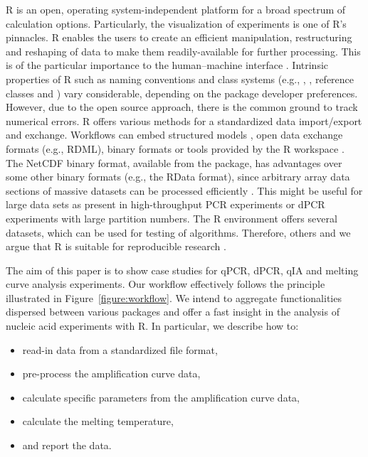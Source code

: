 R is an open, operating system-independent platform for a broad spectrum of 
calculation options. Particularly, the visualization of experiments is one of 
R's pinnacles. R enables the users to create an efficient manipulation, 
restructuring and reshaping of data to make them readily-available for further 
processing. This is of the particular importance to the human--machine interface 
\citep{Oh_2014}. Intrinsic properties of R such as naming conventions 
\citep{Baaaath_2012} and class systems (e.g., , , 
reference classes and ) vary considerable, depending on the package 
developer preferences. However, due to the open source approach, there is the 
common ground to track numerical errors. R offers various methods for a 
standardized data import/export and exchange. Workflows can embed structured 
models \citet{Guazzelli_2009}, open data exchange formats (e.g., RDML), binary 
formats \citep{michna_2013} or tools provided by the R workspace 
\citep{RDCT2010c}. The NetCDF binary format, available from the 
 package, has advantages over some other binary formats (e.g., 
the RData format), since arbitrary array data sections of massive datasets can 
be processed efficiently \citep{michna_2013}. This might be useful for large 
data sets as present in high-throughput PCR experiments or dPCR experiments with large partition 
numbers. The R environment offers several datasets, which can be used for 
testing of algorithms. Therefore, others and we argue that R is suitable for 
reproducible research \citep{Murrell_2012, gandrud_2013, hofmann_2013, 
Ooms_2013, kuhn_cran_2014, Leeper_2014, liu_2014}.

The aim of this paper is to show case studies for qPCR, dPCR, qIA and melting 
curve analysis experiments. Our workflow effectively follows the principle 
illustrated in Figure~\ref{figure:workflow}. We intend to aggregate 
functionalities dispersed between various packages and offer a fast insight in 
the analysis of nucleic acid experiments with R. In particular, we describe how 
to:

\begin{itemize}
 \item read-in data from a standardized file format,
 \item pre-process the amplification curve data,
 \item calculate specific parameters from the amplification curve data,
 \item calculate the melting temperature,
 \item and report the data.
\end{itemize}

